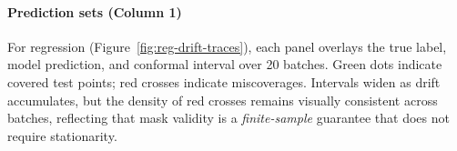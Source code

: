 \documentclass{uai2026} %
\newcommand{\1}{\mathbf{1}}
\begin{document}
\paragraph{Prediction sets (Column 1) }
For regression (Figure~\ref{fig:reg-drift-traces}), each panel overlays the true label, model prediction, and conformal interval over 20 batches.
Green dots indicate covered test points; red crosses indicate miscoverages.
Intervals widen as drift accumulates, but the density of red crosses remains visually consistent across batches, reflecting that mask validity is a \emph{finite-sample} guarantee that does not require stationarity.



\end{document}
